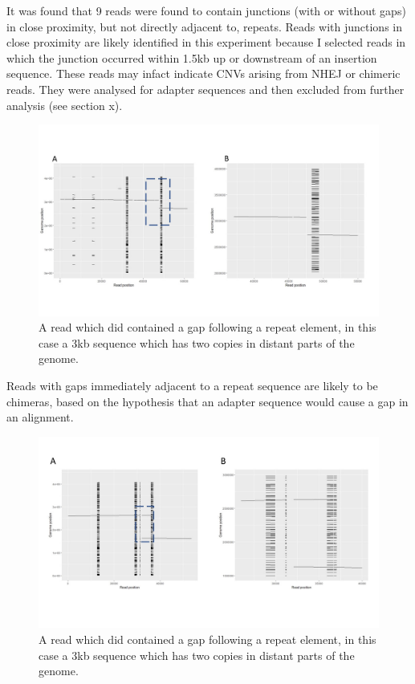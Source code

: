 \documentclass{article}
\begin{document}
It was found that 9 reads were found to contain junctions (with or without gaps) in close proximity, but not directly adjacent to, repeats. Reads with junctions in close proximity are likely identified in this experiment because I selected reads in which the junction occurred within 1.5kb up or downstream of an insertion sequence. These reads may infact indicate CNVs arising from NHEJ or chimeric reads. They were analysed for adapter sequences and then excluded from further analysis (see section x).


\begin{figure}[h!]
\centering
\includegraphics[width=\textwidth{}]{Chapter_2/odd read.jpg}
\caption{A read which did contained a gap following a repeat element, in this case a 3kb sequence which has two copies in distant parts of the genome.}
\label{fig:Junc_proximity}
\end{figure}

Reads with gaps immediately adjacent to a repeat sequence are likely to be chimeras, based on the hypothesis that an adapter sequence would cause a gap in an alignment.

\begin{figure}[h!]
\centering
\includegraphics[width=\textwidth{}]{Chapter_2/Gappy read.jpg}
\caption{A read which did contained a gap following a repeat element, in this case a 3kb sequence which has two copies in distant parts of the genome.}
\label{fig:Gap_adj}
\end{figure}
\end{document}
